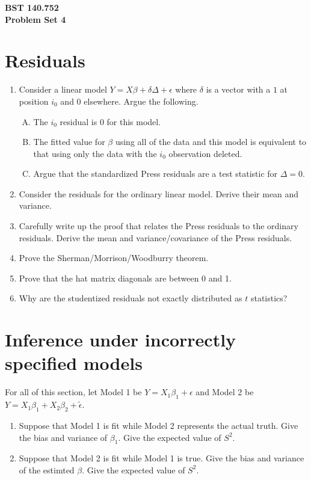 \documentclass[12pt]{article}
\begin{document}
\noindent
{\bf BST 140.752 \\ Problem Set 4} \\
\section{Residuals}
\begin{enumerate}
\item Consider a linear model $Y = X\beta + \delta \Delta + \epsilon$ where $\delta$ is a vector with a $1$ at position $i_0$ and $0$ elsewhere. Argue the following.
\begin{enumerate}[A.]
\item The $i_0$ residual is $0$ for this model.
\item The fitted value for $\beta$ using all of the data and this model is equivalent to that using only the data with the $i_0$ observation deleted.
\item Argue that the standardized Press residuals are a test statistic for $\Delta = 0$.
\end{enumerate}
\item Consider the residuals for the ordinary linear model. Derive their mean and variance. 
\item Carefully write up the proof that relates the Press residuals to the ordinary residuals. Derive the mean and variance/covariance of the Press residuals.
\item Prove the Sherman/Morrison/Woodburry theorem.
\item Prove that the hat matrix diagonals are between 0 and 1.
\item Why are the studentized residuals not exactly distributed as $t$ statistics?
\end{enumerate}

\section{Inference under incorrectly specified models}
For all of this section, let Model 1 be $Y = X_1 \beta_1 + \epsilon$ and Model 2 be $Y = X_1 \beta_1 + X_2 \beta_2 + \tilde \epsilon$. 
\begin{enumerate}
\item Suppose that Model 1 is fit while Model 2 represents the actual truth. Give the bias and variance of $\beta_1$. Give the
expected value of $S^2$.
\item Suppose that Model 2 is fit while Model 1 is true. Give the bias and variance of the estimted $\beta$. Give the expected value of $S^2$. 
\end{enumerate}
\end{document}
